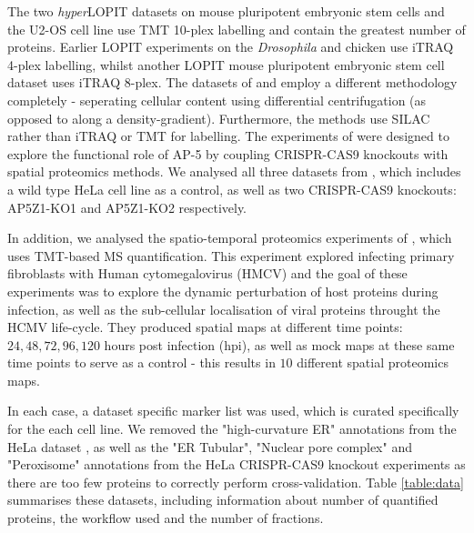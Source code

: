 \documentclass[12pt,english]{article}\usepackage[]{graphicx}\usepackage[]{color}
\begin{document}
The two \textit{hyper}LOPIT datasets on mouse pluripotent embryonic
stem cells and the U2-OS cell line use TMT 10-plex labelling and
contain the greatest number of proteins.  Earlier LOPIT experiments on
the \textit{Drosophila} and chicken use iTRAQ 4-plex labelling, whilst
another LOPIT mouse pluripotent embryonic stem cell dataset uses iTRAQ
8-plex. The datasets of \cite{Itzhak:2016} and \cite{Hirst:2018}
employ a different methodology completely - seperating cellular
content using differential centrifugation (as opposed to along a
density-gradient).  Furthermore, the methods use SILAC rather than
iTRAQ or TMT for labelling. The experiments of \cite{Hirst:2018} were
designed to explore the functional role of AP-5 by coupling
CRISPR-CAS9 knockouts with spatial proteomics methods. We analysed all
three datasets from \cite{Hirst:2018}, which includes a wild type HeLa
cell line as a control, as well as two CRISPR-CAS9 knockouts:
AP5Z1-KO1 and AP5Z1-KO2 respectively.

In addition, we analysed the spatio-temporal proteomics experiments of
\cite{Jean_Beltran:2016}, which uses TMT-based MS quantification. This
experiment explored infecting primary fibroblasts with Human
cytomegalovirus (HMCV) and the goal of these experiments was to
explore the dynamic perturbation of host proteins during infection, as
well as the sub-cellular localisation of viral proteins throught the
HCMV life-cycle. They produced spatial maps at different time points:
$24,48,72,96,120$ hours post infection (hpi), as well as mock maps at
these same time points to serve as a control - this results in $10$
different spatial proteomics maps.

In each case, a dataset specific marker list was used, which is
curated specifically for the each cell line. We removed the
"high-curvature ER" annotations from the HeLa dataset
\citep{Itzhak:2016}, as well as the "ER Tubular", "Nuclear pore
complex" and "Peroxisome" annotations from the HeLa CRISPR-CAS9
knockout experiments \citep{Hirst:2018} as there are too few proteins
to correctly perform cross-validation. Table \ref{table:data}
summarises these datasets, including information about number of
quantified proteins, the workflow used and the number of fractions.
\end{document}
